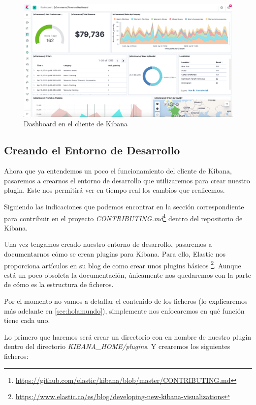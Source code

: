 \documentclass[a4paper, 12pt]{book}
\begin{document}
\begin{figure}[H]
  \centering
  \includegraphics[width=12cm, keepaspectratio]{img/development/kibana-dashboard.png}
  \caption{Dashboard en el cliente de Kibana}
  \label{fig:Kibanadashboard}
\end{figure}


\subsection{Creando el Entorno de Desarrollo}
\label{sec:entorno}

Ahora que ya entendemos un poco el funcionamiento del cliente de Kibana, pasaremos a crearnos el entorno de desarrollo que utilizaremos para crear nuestro plugin. Este nos permitirá ver en tiempo real los cambios que realicemos.

Siguiendo las indicaciones que podemos encontrar en la sección correspondiente para contribuir en el proyecto \textit{CONTRIBUTING.md}\footnote{\url{https://github.com/elastic/kibana/blob/master/CONTRIBUTING.md}} dentro del repositorio de Kibana.

Una vez tengamos creado nuestro entorno de desarrollo, pasaremos a documentarnos cómo se crean plugins para Kibana. Para ello, Elastic nos proporciona artículos en su blog de como crear unos plugins básicos \footnote{\url{https://www.elastic.co/es/blog/developing-new-kibana-visualizations}}. Aunque está un poco obsoleta la documentación, únicamente nos quedaremos con la parte de cómo es la estructura de ficheros.

Por el momento no vamos a detallar el contenido de los ficheros (lo explicaremos más adelante en \ref{sec:holamundo}), simplemente nos enfocaremos en qué función tiene cada uno.

Lo primero que haremos será crear un directorio con en nombre de nuestro plugin dentro del directorio \textit{KIBANA\_HOME/plugins}. Y crearemos los siguientes ficheros:
\end{document}
